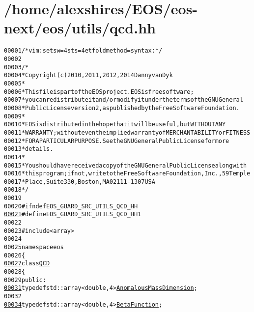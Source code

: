\hypertarget{qcd_8hh_source}{
\section{/home/alexshires/EOS/eos-\/next/eos/utils/qcd.hh}
}


\begin{footnotesize}\begin{alltt}
00001 \textcolor{comment}{/* vim: set sw=4 sts=4 et foldmethod=syntax : */}
00002 
00003 \textcolor{comment}{/*}
00004 \textcolor{comment}{ * Copyright (c) 2010, 2011, 2012, 2014 Danny van Dyk}
00005 \textcolor{comment}{ *}
00006 \textcolor{comment}{ * This file is part of the EOS project. EOS is free software;}
00007 \textcolor{comment}{ * you can redistribute it and/or modify it under the terms of the GNU General}
00008 \textcolor{comment}{ * Public License version 2, as published by the Free Software Foundation.}
00009 \textcolor{comment}{ *}
00010 \textcolor{comment}{ * EOS is distributed in the hope that it will be useful, but WITHOUT ANY}
00011 \textcolor{comment}{ * WARRANTY; without even the implied warranty of MERCHANTABILITY or FITNESS}
00012 \textcolor{comment}{ * FOR A PARTICULAR PURPOSE.  See the GNU General Public License for more}
00013 \textcolor{comment}{ * details.}
00014 \textcolor{comment}{ *}
00015 \textcolor{comment}{ * You should have received a copy of the GNU General Public License along with}
00016 \textcolor{comment}{ * this program; if not, write to the Free Software Foundation, Inc., 59 Temple}
00017 \textcolor{comment}{ * Place, Suite 330, Boston, MA  02111-1307  USA}
00018 \textcolor{comment}{ */}
00019 
00020 \textcolor{preprocessor}{#ifndef EOS\_GUARD\_SRC\_UTILS\_QCD\_HH}
\hypertarget{qcd_8hh_source_l00021}{}\hyperlink{qcd_8hh_a3e93fae0351bb6b9ea4306536fab62e2}{00021} \textcolor{preprocessor}{}\textcolor{preprocessor}{#define EOS\_GUARD\_SRC\_UTILS\_QCD\_HH 1}
00022 \textcolor{preprocessor}{}
00023 \textcolor{preprocessor}{#include <array>}
00024 
00025 \textcolor{keyword}{namespace }eos
00026 \{
\hypertarget{qcd_8hh_source_l00027}{}\hyperlink{classeos_1_1QCD}{00027}     \textcolor{keyword}{class }\hyperlink{classeos_1_1QCD}{QCD}
00028     \{
00029         \textcolor{keyword}{public}:
\hypertarget{qcd_8hh_source_l00031}{}\hyperlink{classeos_1_1QCD_a3ca5eea2df0bd5c0043071e14c58d089}{00031}             \textcolor{keyword}{typedef} std::array<double, 4> \hyperlink{classeos_1_1QCD_a3ca5eea2df0bd5c0043071e14c58d089}{AnomalousMassDimension};
00032 
\hypertarget{qcd_8hh_source_l00034}{}\hyperlink{classeos_1_1QCD_a1261bb4643fea3012beb0a9ea78b7dea}{00034}             \textcolor{keyword}{typedef} std::array<double, 4> \hyperlink{classeos_1_1QCD_a1261bb4643fea3012beb0a9ea78b7dea}{BetaFunction};

\end{alltt}
\end{footnotesize}

